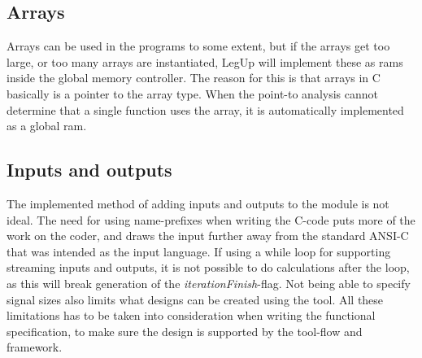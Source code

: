 \subsection{Arrays}
Arrays can be used in the programs to some extent, but if the arrays get too large, or too many arrays are instantiated, LegUp will implement these as \gls{ram}s inside the global memory controller. The reason for this is that arrays in C basically is a pointer to the array type. When the point-to analysis cannot determine that a single function uses the array, it is automatically implemented as a global \gls{ram}.
\subsection{Inputs and outputs}
The implemented method of adding inputs and outputs to the module is not ideal. The need for using name-prefixes when writing the C-code puts more of the work on the coder, and draws the input further away from the standard ANSI-C that was intended as the input language. If using a while loop for supporting streaming inputs and outputs, it is not possible to do calculations after the loop, as this will break generation of the \textit{iterationFinish}-flag. Not being able to specify signal sizes also limits what designs can be created using the tool. All these limitations has to be taken into consideration when writing the functional specification, to make sure the design is supported by the tool-flow and framework.